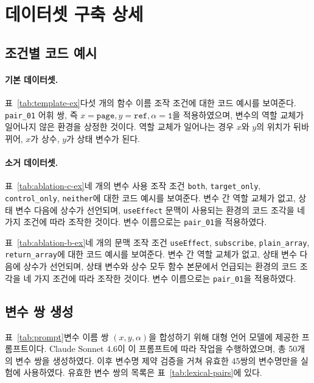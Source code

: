 \documentclass[11pt]{article}
\begin{document}


\appendix

\section{데이터셋 구축 상세}
\label{sec:appendix-a}
\subsection{조건별 코드 예시}
\label{sec:template-ex}

\paragraph{기본 데이터셋.}
표~\ref{tab:template-ex}\는 다섯 개의 함수 이름 조작 조건에 대한 코드 예시를 보여준다.
\texttt{pair\_01} 어휘 쌍, 즉 $x=\texttt{page}, y=\texttt{ref}, \alpha=\texttt{1}$을 적용하였으며, 변수의 역할 교체가 일어나지 않은 환경을 상정한 것이다.
역할 교체가 일어나는 경우 $x$와 $y$의 위치가 뒤바뀌어, $x$가 상수, $y$가 상태 변수가 된다.

\paragraph{소거 데이터셋.}
표~\ref{tab:ablation-c-ex}\는 네 개의 변수 사용 조작 조건 \texttt{both}, \texttt{target\_only}, \texttt{control\_only}, \texttt{neither}에 대한 코드 예시를 보여준다.
변수 간 역할 교체가 없고, 상태 변수 다음에 상수가 선언되며, \texttt{useEffect} 문맥이 사용되는 환경의 코드 조각을 네 가지 조건에 따라 조작한 것이다.
변수 이름으로는 \texttt{pair\_01}을 적용하였다.

표~\ref{tab:ablation-b-ex}\는 네 개의 문맥 조작 조건 \texttt{useEffect}, \texttt{subscribe}, \texttt{plain\_array}, \texttt{return\_array}에 대한 코드 예시를 보여준다.
변수 간 역할 교체가 없고, 상태 변수 다음에 상수가 선언되며, 상태 변수와 상수 모두 함수 본문에서 언급되는 환경의 코드 조각을 네 가지 조건에 따라 조작한 것이다.
변수 이름으로는 \texttt{pair\_01}을 적용하였다.





\subsection{변수 쌍 생성}
표~\ref{tab:prompt}\는 변수 이름 쌍 $(x, y, \alpha)$을 합성하기 위해 대형 언어 모델에 제공한 프롬프트이다.
Claude Sonnet 4.6\citep{claude}이 이 프롬프트에 따라 작업을 수행하였으며, 총 50개의 변수 쌍을 생성하였다.
이후 변수명 제약 검증을 거쳐 유효한 45쌍의 변수명만을 실험에 사용하였다.
유효한 변수 쌍의 목록은 표~\ref{tab:lexical-pairs}에 있다.





\end{document}
